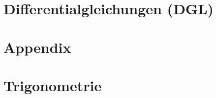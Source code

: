 \documentclass[numerate]{cheatsheet}
\begin{document}
    \section{Differentialgleichungen (DGL)}
        
        
        
        
        
        
        
        
        
        \vfill \null \columnbreak
        
        \vfill \null \columnbreak
        
        \newpage

    \section{Appendix}
        
        
        
        
        
        
        
        
        
        
        
        
        \vfill \null \columnbreak
        \section{Trigonometrie}
        
        
        
        
\end{document}
